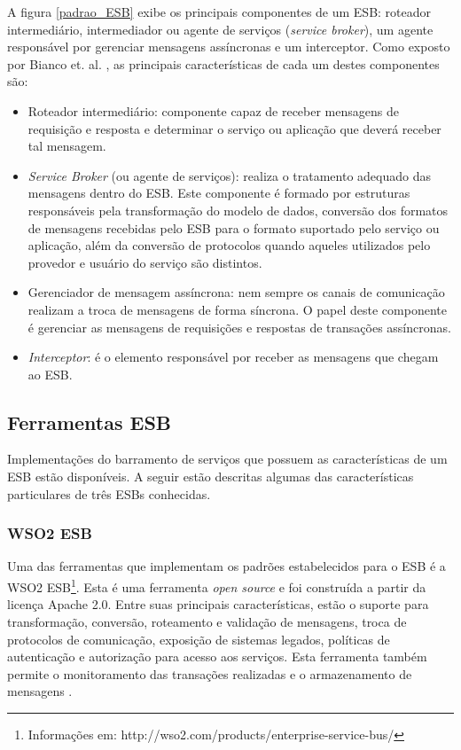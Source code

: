 A figura \ref{padrao_ESB} exibe os principais componentes de um ESB: roteador intermediário, intermediador ou agente de serviços (\textit{service broker}), um agente responsável por gerenciar mensagens assíncronas e um interceptor. Como exposto por Bianco et. al. \cite{bianco_architecting_2011}, as principais características de cada um destes componentes são:

\begin{itemize}

\item Roteador intermediário: componente capaz de receber mensagens de requisição e resposta e determinar o serviço ou aplicação que deverá receber tal mensagem.

\item \textit{Service Broker} (ou agente de serviços): realiza o tratamento adequado das mensagens dentro do ESB. Este componente é formado por estruturas responsáveis pela transformação do modelo de dados, conversão dos formatos de mensagens recebidas pelo ESB para o formato suportado pelo serviço ou aplicação, além da conversão de protocolos quando aqueles utilizados pelo provedor e usuário do serviço são distintos.

\item Gerenciador de mensagem assíncrona: nem sempre os canais de comunicação realizam a troca de mensagens de forma síncrona. O papel deste componente é gerenciar as mensagens de requisições e respostas de transações assíncronas.

\item \textit{Interceptor}: é o elemento responsável por receber as mensagens que chegam ao ESB.
\end{itemize}

\subsection{Ferramentas ESB}

Implementações do barramento de serviços que possuem as características de um ESB estão disponíveis. A seguir estão descritas algumas das características particulares de três ESBs conhecidas.

\subsubsection{WSO2 ESB}
Uma das ferramentas que implementam os padrões estabelecidos para o ESB é a WSO2 ESB\footnote{Informações em: http://wso2.com/products/enterprise-service-bus/}. Esta é uma ferramenta \textit{open source} e foi construída a partir da licença Apache 2.0. Entre suas principais características, estão o suporte para transformação, conversão, roteamento e validação de mensagens, troca de protocolos de comunicação, exposição de sistemas legados, políticas de autenticação e autorização para acesso aos serviços. Esta ferramenta também permite o monitoramento das transações realizadas e o armazenamento de mensagens \cite{siriwardena_enterprise_2013}.

